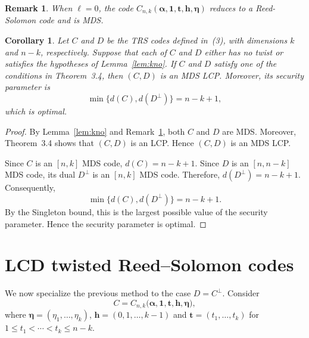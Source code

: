 \documentclass[12pt,draftcls,journal,onecolumn]{IEEEtran}
\newtheorem{remark}[theorem]{Remark}
\newtheorem{corollary}[theorem]{Corollary}
\begin{document}
\begin{remark}\label{rem:zero-twist}
When \(\ell=0\), the code
\(
C_{n,k}(\boldsymbol{\alpha},\boldsymbol{1},\boldsymbol{t},
\mathbf{h},\boldsymbol{\eta})
\)
reduces to a Reed-Solomon code and is MDS.
\end{remark}

\begin{corollary}\label{cor:MDSLCP}
Let \(C\) and \(D\) be the TRS codes defined in~(3), with
dimensions \(k\) and \(n-k\), respectively. Suppose that each of
\(C\) and \(D\) either has no twist or satisfies the hypotheses of
Lemma~\ref{lem:kno}. If \(C\) and \(D\) satisfy one of the
conditions in Theorem~3.4, then \((C,D)\) is an MDS LCP.
Moreover, its security parameter is
\[
\min\{d(C),d(D^\perp)\}=n-k+1,
\]
which is optimal.
\end{corollary}

\begin{proof}
By Lemma~\ref{lem:kno} and Remark~\ref{rem:zero-twist},
both \(C\) and \(D\) are MDS. Moreover, Theorem~3.4 shows that
\((C,D)\) is an LCP. Hence \((C,D)\) is an MDS LCP.

Since \(C\) is an \([n,k]\) MDS code,
\(
d(C)=n-k+1.
\)
Since \(D\) is an \([n,n-k]\) MDS code, its dual \(D^\perp\) is an
\([n,k]\) MDS code. Therefore,
\(
d(D^\perp)=n-k+1.
\)
Consequently,
\[
\min\{d(C),d(D^\perp)\}=n-k+1.
\]
By the Singleton bound, this is the largest possible value of the
security parameter. Hence the security parameter is optimal.
\end{proof}


\section{LCD twisted Reed--Solomon codes}

\renewcommand{\thetheorem}{\arabic{section}.\arabic{theorem}}
\setcounter{theorem}{0}

We now specialize the previous method to the case $D=C^\perp$. Consider
\[
C=C_{n,k}\bigl(
\boldsymbol{\alpha},\mathbf{1},
\boldsymbol{t},\boldsymbol{h},\boldsymbol{\eta}
\bigr),
\]
where $\boldsymbol{\eta}=(\eta_1,\ldots,\eta_k)$,
$
\boldsymbol{h}=(0,1,\ldots,k-1)
$ and
$
\boldsymbol{t}=(t_1,\ldots,t_k)
$
for
$
1\le t_1<\cdots<t_k\le n-k.
$
\end{document}

